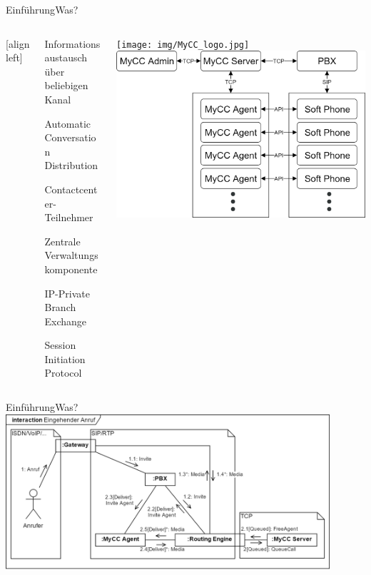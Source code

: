 \documentclass[t,aspectratio=169,divpsnames]{beamer}
\begin{document}
\begin{frame}{Einführung}{Was?}
	\begin{columns}[T]
		[align left]
		\begin{column}{0.55\textwidth}
			\only<2->
			{
				\begin{description}[leftmargin=!,labelwidth=\widthof{\bfseries Routing Engine}]
					\item<2->[Konversation] Informationsaustausch über beliebigen Kanal
					\item<3->[ACD] Automatic Conversation Distribution	
					\item<4->[Agent] Contactcenter-Teilnehmer
					\item<5->[MyCC-Server] Zentrale Verwaltungskomponente		
					\item<6->[IP-PBX] IP-Private Branch Exchange
					\item<7->[SIP] Session Initiation Protocol
				\end{description}
			}
		\end{column}
		\begin{column}{0.45\textwidth}
				\only<1-7>
				{
					\vspace{0.5cm}
        			\texttt{[image: img/MyCC\_logo.jpg]}
				}        		
        		\only<8>
				{
					\vspace{0.5cm}
					\includegraphics[scale=0.15]{img/MyCCStructure.png}
				}
    	\end{column}
    \end{columns}
\end{frame}

\begin{frame}{Einführung}{Was?}
	\center
	\includegraphics[width=0.9\textwidth]{img/RoutingEngineSipExplanation.png}
\end{frame}
\end{document}
